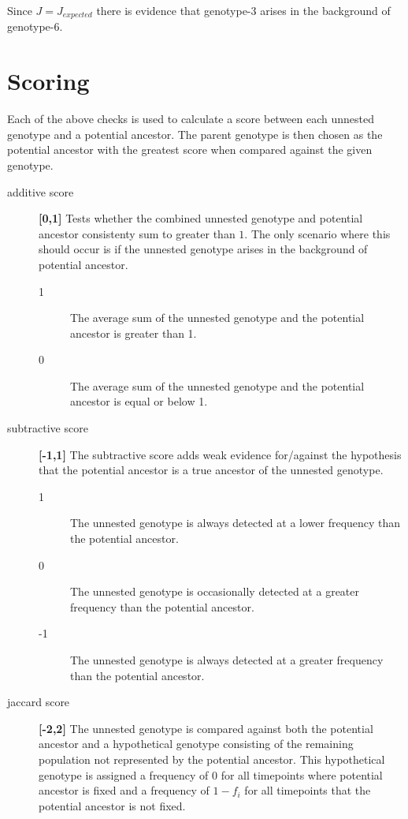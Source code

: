 \documentclass{book}
\newcommand{\unnestedlabel}{unnested genotype}
\newcommand{\ancestorlabel}{potential ancestor}
\begin{document}
Since $J = J_{expected}$ there is evidence that genotype-3 arises in the background of genotype-6.


\section{Scoring}
Each of the above checks is used to calculate a score between each \unnestedlabel{} and a \ancestorlabel{}. 
The parent genotype is then chosen as the potential ancestor with the greatest score when compared against the given genotype.

\begin{description}
  \item[additive score] \textbf{[0,1]} Tests whether the combined \unnestedlabel{} and \ancestorlabel{} consistenty sum to greater than $1$. 
  The only scenario where this should occur is if the \unnestedlabel{} arises in the background of \ancestorlabel{}.
  \begin{description}
    \item[1] The average sum of the \unnestedlabel{} and the \ancestorlabel{} is greater than 1.
    \item[0] The average sum of the \unnestedlabel{} and the \ancestorlabel{} is equal or below 1. 
  \end{description}
  \item[subtractive score] \textbf{[-1,1]} The subtractive score adds weak evidence for/against the hypothesis that the \ancestorlabel{} is a true ancestor of the \unnestedlabel{}.
    \begin{description}
      \item[1]  The \unnestedlabel{} is always detected at a lower frequency than the \ancestorlabel{}.
      \item[0]  The \unnestedlabel{} is occasionally detected at a greater frequency than the \ancestorlabel{}.
      \item[-1] The \unnestedlabel{} is always detected at a greater frequency than the \ancestorlabel{}.
    \end{description}
  \item[jaccard score] \textbf{[-2,2]} The \unnestedlabel{} is compared against both the \ancestorlabel{} and a hypothetical genotype consisting of the remaining
    population not represented by the \ancestorlabel{}. This hypothetical genotype is assigned a frequency of $0$ for all timepoints where \ancestorlabel{} is 
    fixed and a frequency of $1-f_i$ for all timepoints that the \ancestorlabel{} is not fixed. 

\end{description}
\end{document}
